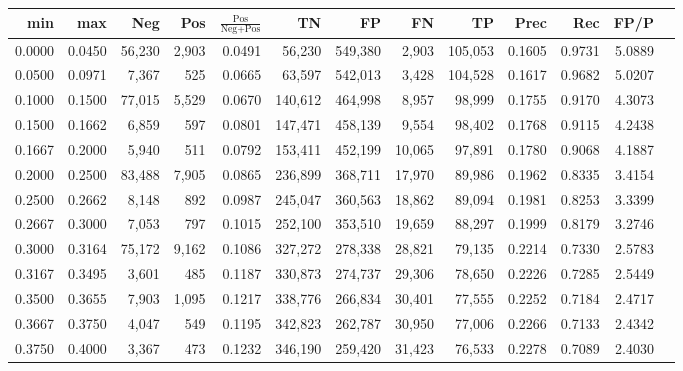 \begin{tabular}{rrrrrrrrrrrrr}
\toprule
   min &    max &    Neg &    Pos & $\frac{\text{Pos}}{\text{Neg}+\text{Pos}}$ &      TN &      FP &      FN &      TP &   Prec &    Rec &   FP/P \\
\midrule
0.0000 & 0.0450 & 56,230 &  2,903 &                                     0.0491 &  56,230 & 549,380 &   2,903 & 105,053 & 0.1605 & 0.9731 & 5.0889 \\
0.0500 & 0.0971 &  7,367 &    525 &                                     0.0665 &  63,597 & 542,013 &   3,428 & 104,528 & 0.1617 & 0.9682 & 5.0207 \\
0.1000 & 0.1500 & 77,015 &  5,529 &                                     0.0670 & 140,612 & 464,998 &   8,957 &  98,999 & 0.1755 & 0.9170 & 4.3073 \\
0.1500 & 0.1662 &  6,859 &    597 &                                     0.0801 & 147,471 & 458,139 &   9,554 &  98,402 & 0.1768 & 0.9115 & 4.2438 \\
0.1667 & 0.2000 &  5,940 &    511 &                                     0.0792 & 153,411 & 452,199 &  10,065 &  97,891 & 0.1780 & 0.9068 & 4.1887 \\
0.2000 & 0.2500 & 83,488 &  7,905 &                                     0.0865 & 236,899 & 368,711 &  17,970 &  89,986 & 0.1962 & 0.8335 & 3.4154 \\
0.2500 & 0.2662 &  8,148 &    892 &                                     0.0987 & 245,047 & 360,563 &  18,862 &  89,094 & 0.1981 & 0.8253 & 3.3399 \\
0.2667 & 0.3000 &  7,053 &    797 &                                     0.1015 & 252,100 & 353,510 &  19,659 &  88,297 & 0.1999 & 0.8179 & 3.2746 \\
0.3000 & 0.3164 & 75,172 &  9,162 &                                     0.1086 & 327,272 & 278,338 &  28,821 &  79,135 & 0.2214 & 0.7330 & 2.5783 \\
0.3167 & 0.3495 &  3,601 &    485 &                                     0.1187 & 330,873 & 274,737 &  29,306 &  78,650 & 0.2226 & 0.7285 & 2.5449 \\
0.3500 & 0.3655 &  7,903 &  1,095 &                                     0.1217 & 338,776 & 266,834 &  30,401 &  77,555 & 0.2252 & 0.7184 & 2.4717 \\
0.3667 & 0.3750 &  4,047 &    549 &                                     0.1195 & 342,823 & 262,787 &  30,950 &  77,006 & 0.2266 & 0.7133 & 2.4342 \\
0.3750 & 0.4000 &  3,367 &    473 &                                     0.1232 & 346,190 & 259,420 &  31,423 &  76,533 & 0.2278 & 0.7089 & 2.4030 \\

\end{tabular}
